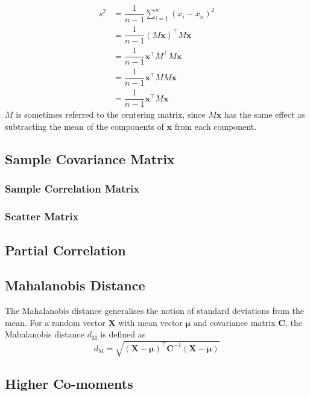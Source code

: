\documentclass[11pt]{report} %
\begin{document}
\begin{align}
s^{2} &= \dfrac{1}{n - 1}\sum_{i = 1}^{n}\left(x_{i} - \overline{x}_{n}\right)^{2} \\
&= \dfrac{1}{n - 1}\left(M\mathbf{x}\right)^{\top}M\mathbf{x} \\
&= \dfrac{1}{n - 1}\mathbf{x}^{\top}M^{\top}M\mathbf{x} \\
&= \dfrac{1}{n - 1}\mathbf{x}^{\top}MM\mathbf{x} \\
&= \dfrac{1}{n - 1}\mathbf{x}^{\top}M\mathbf{x}
\end{align}
$M$ is sometimes referred to the centering matrix, since $M\mathbf{x}$ has the same effect as subtracting the mean of the components of $\mathbf{x}$ from each component.

\subsection{Sample Covariance Matrix}

\subsubsection{Sample Correlation Matrix}

\subsubsection{Scatter Matrix}

\subsection{Partial Correlation}

\subsection{Mahalanobis Distance}

The Mahalanobis distance generalises the notion of standard deviations from the mean. For a random vector $\mathbf{X}$ with mean vector $\boldsymbol{\mu}$ and covariance matrix $\mathbf{C}$, the Mahalanobis distance $d_{\mathrm{M}}$ is defined as
\begin{equation}
d_{\mathrm{M}} = \sqrt{\left(\mathbf{X} - \boldsymbol{\mu}\right)^{\top}\mathbf{C}^{-1}\left(\mathbf{X} - \boldsymbol{\mu}\right)}
\end{equation}

\subsection{Higher Co-moments \cite{Miller2013}}
\end{document}
